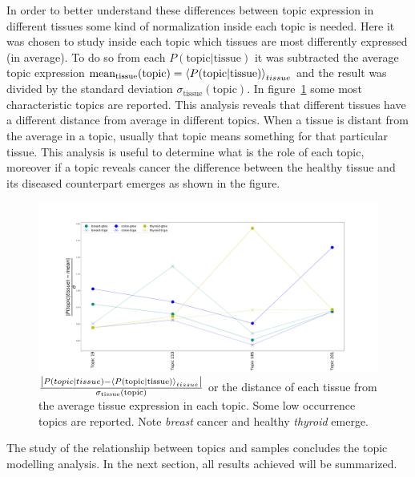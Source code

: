 In order to better understand these differences between topic expression in different tissues some kind of normalization inside each topic is needed. Here it was chosen to study inside each topic which tissues are most differently expressed (in average). To do so from each $P(\text{topic}| \text{tissue})$ it was subtracted the average topic expression $\text{mean}_{\text{tissue}}(\text{topic})=\left\langle P(\text{topic}| \text{tissue})\right\rangle_{tissue}$ and the result was divided by the standard deviation $\sigma_{\text{tissue}}(\text{topic})$. In figure~\ref{fig:topic/merged/lifeplot_normalised_level3_hd} some most characteristic topics are reported. This analysis reveals that different tissues have a different distance from average in different topics. When a tissue is distant from the average in a topic, usually that topic means something for that particular tissue. This analysis is useful to determine what is the role of each topic, moreover if a topic reveals cancer the difference between the healthy tissue and its diseased counterpart emerges as shown in the figure.
\begin{figure}[htb!]
	\centering
	\includegraphics[width=0.85\linewidth]{pictures/topic/merged/lifeplot_normalised_level3_hd.pdf}
	\caption{$\frac{\left|P(topic | tissue) - \left\langle P(\text{topic}| \text{tissue})\right\rangle_{tissue}\right|}{\sigma_{\text{tissue}}(\text{topic})}$ or the distance of each tissue from the average tissue expression in each topic. Some low occurrence topics are reported. Note \textit{breast} cancer and healthy \textit{thyroid} emerge.}
	\label{fig:topic/merged/lifeplot_normalised_level3_hd}
\end{figure}

The study of the relationship between topics and samples concludes the topic modelling analysis. In the next section, all results achieved will be summarized.